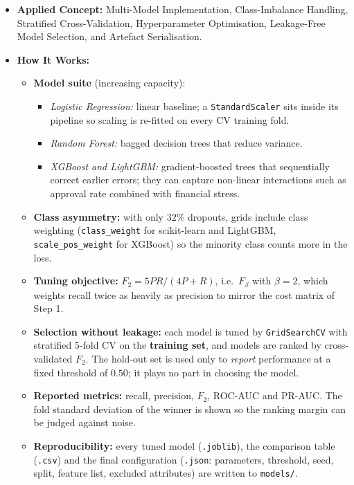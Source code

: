 \documentclass[11pt]{article}
\providecommand{\tightlist}{%
      \setlength{\itemsep}{0pt}\setlength{\parskip}{0pt}}
\begin{document}
\begin{itemize}
\tightlist
\item
  \textbf{Applied Concept:} Multi-Model Implementation, Class-Imbalance
  Handling, Stratified Cross-Validation, Hyperparameter Optimisation,
  Leakage-Free Model Selection, and Artefact Serialisation.
\item
  \textbf{How It Works:}

  \begin{itemize}
  \tightlist
  \item
    \textbf{Model suite} (increasing capacity):

    \begin{itemize}
    \tightlist
    \item
      \emph{Logistic Regression:} linear baseline; a
      \texttt{StandardScaler} sits inside its pipeline so scaling is
      re-fitted on every CV training fold.
    \item
      \emph{Random Forest:} bagged decision trees that reduce variance.
    \item
      \emph{XGBoost and LightGBM:} gradient-boosted trees that
      sequentially correct earlier errors; they can capture non-linear
      interactions such as approval rate combined with financial stress.
    \end{itemize}
  \item
    \textbf{Class asymmetry:} with only \(32\%\) dropouts, grids include
    class weighting (\texttt{class\_weight} for scikit-learn and
    LightGBM, \texttt{scale\_pos\_weight} for XGBoost) so the minority
    class counts more in the loss.
  \item
    \textbf{Tuning objective:} \(F_2 = 5PR / (4P + R)\),
    i.e.~\(F_\beta\) with \(\beta = 2\), which weights recall twice as
    heavily as precision to mirror the cost matrix of Step 1.
  \item
    \textbf{Selection without leakage:} each model is tuned by
    \texttt{GridSearchCV} with stratified 5-fold CV on the
    \textbf{training set}, and models are ranked by cross-validated
    \(F_2\). The hold-out set is used only to \emph{report} performance
    at a fixed threshold of \(0.50\); it plays no part in choosing the
    model.
  \item
    \textbf{Reported metrics:} recall, precision, \(F_2\), ROC-AUC and
    PR-AUC. The fold standard deviation of the winner is shown so the
    ranking margin can be judged against noise.
  \item
    \textbf{Reproducibility:} every tuned model (\texttt{.joblib}), the
    comparison table (\texttt{.csv}) and the final configuration
    (\texttt{.json}: parameters, threshold, seed, split, feature list,
    excluded attributes) are written to \texttt{models/}.
  \end{itemize}
\end{itemize}
\end{document}
